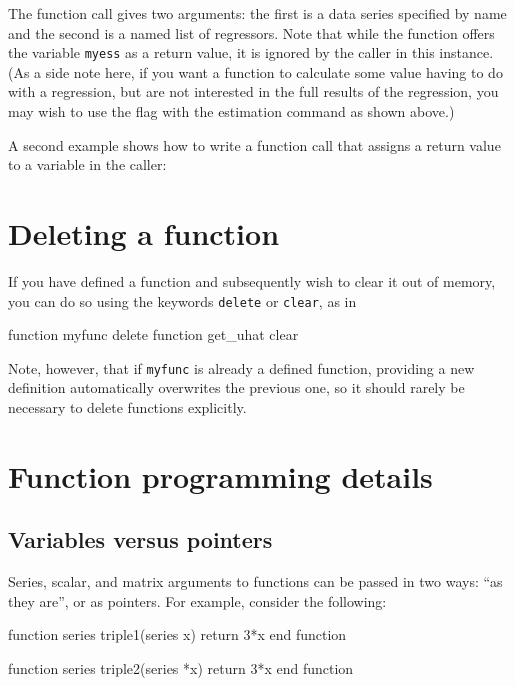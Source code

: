 The function call gives two arguments: the first is a data series
specified by name and the second is a named list of regressors.  Note
that while the function offers the variable \verb+myess+ as a return
value, it is ignored by the caller in this instance.  (As a side note
here, if you want a function to calculate some value having to do with
a regression, but are not interested in the full results of the
regression, you may wish to use the  flag with the
estimation command as shown above.)
    
A second example shows how to write a function call that assigns
a return value to a variable in the caller:
    

\section{Deleting a function}
\label{func-del}

If you have defined a function and subsequently wish to clear it out
of memory, you can do so using the keywords \texttt{delete} or
\texttt{clear}, as in

\begin{code}
function myfunc delete
function get_uhat clear
\end{code}

Note, however, that if \texttt{myfunc} is already a defined function,
providing a new definition automatically overwrites the previous one,
so it should rarely be necessary to delete functions explicitly.

\section{Function programming details}
\label{func-details}

\subsection{Variables versus pointers}
\label{funscope}

Series, scalar, and matrix arguments to functions can be passed in two
ways: ``as they are'', or as pointers. For example, consider the
following:
\begin{code}
function series triple1(series x)
  return 3*x
end function
  
function series triple2(series *x)
  return 3*x
end function
\end{code}

